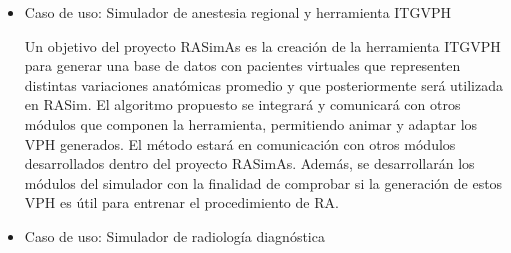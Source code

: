 \begin{itemize}





\begin{itemize}
    \item 	Caso de uso: Simulador de anestesia regional y herramienta \acs{ITGVPH} 
    
    Un objetivo del proyecto \ac{RASimAs} es la creación de la herramienta \ac{ITGVPH} para generar una base de datos con pacientes virtuales que representen distintas variaciones anatómicas promedio y que posteriormente será utilizada en \ac{RASim}.
    El algoritmo propuesto se integrará y comunicará con otros módulos que componen la herramienta, permitiendo animar y adaptar los \ac{VPH} generados. El método estará en comunicación con otros módulos desarrollados dentro del proyecto \ac{RASimAs}. Además, se desarrollarán los módulos del simulador con la finalidad de comprobar si la generación de estos \ac{VPH} es útil para entrenar el procedimiento de \ac{RA}.
    


    

    \item Caso de uso: Simulador de radiología diagnóstica


\end{itemize}
\end{itemize}
